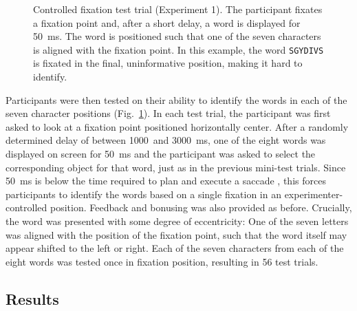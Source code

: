\documentclass[doc,biblatex,floatsintext]{apa7}
\begin{document}
\begin{figure}
\vspace*{2pt}
\caption{Controlled fixation test trial (Experiment 1). The participant fixates a fixation point and, after a short delay, a word is displayed for 50~ms. The word is positioned such that one of the seven characters is aligned with the fixation point. In this example, the word \texttt{SGYDIVS} is fixated in the final, uninformative position, making it hard to identify.}
\label{fig04}
\end{figure}

Participants were then tested on their ability to identify the words in each of the seven character positions (Fig.~\ref{fig04}). In each test trial, the participant was first asked to look at a fixation point positioned horizontally center. After a randomly determined delay of between 1000~and 3000~ms, one of the eight words was displayed on screen for 50~ms and the participant was asked to select the corresponding object for that word, just as in the previous mini-test trials. Since 50~ms is below the time required to plan and execute a saccade \parencite{Rayner:1998}, this forces participants to identify the words based on a single fixation in an experimenter-controlled position. Feedback and bonusing was also provided as before. Crucially, the word was presented with some degree of eccentricity: One of the seven letters was aligned with the position of the fixation point, such that the word itself may appear shifted to the left or right. Each of the seven characters from each of the eight words was tested once in fixation position, resulting in 56 test trials.

\subsection{Results}
\end{document}
